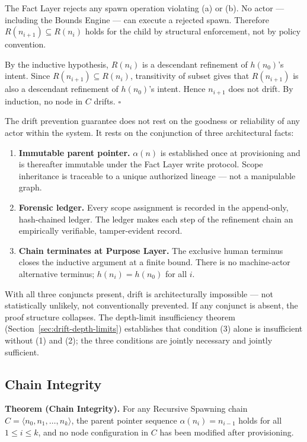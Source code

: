 The Fact Layer rejects any spawn operation violating (a) or (b). No actor — including the Bounds Engine — can execute a rejected spawn. Therefore $R(n_{i+1}) \subseteq R(n_i)$ holds for the child by structural enforcement, not by policy convention.

By the inductive hypothesis, $R(n_i)$ is a descendant refinement of $h(n_0)$'s intent. Since $R(n_{i+1}) \subseteq R(n_i)$, transitivity of subset gives that $R(n_{i+1})$ is also a descendant refinement of $h(n_0)$'s intent. Hence $n_{i+1}$ does not drift. By induction, no node in $C$ drifts. $\square$

\medskip
The drift prevention guarantee does not rest on the goodness or reliability of any actor within the system. It rests on the conjunction of three architectural facts:

\begin{enumerate}
    \item[(1)] \textbf{Immutable parent pointer.} $\alpha(n)$ is established once at provisioning and is thereafter immutable under the Fact Layer write protocol. Scope inheritance is traceable to a unique authorized lineage — not a manipulable graph.
    \item[(2)] \textbf{Forensic ledger.} Every scope assignment is recorded in the append-only, hash-chained ledger. The ledger makes each step of the refinement chain an empirically verifiable, tamper-evident record.
    \item[(3)] \textbf{Chain terminates at Purpose Layer.} The exclusive human terminus closes the inductive argument at a finite bound. There is no machine-actor alternative terminus; $h(n_i) = h(n_0)$ for all $i$.
\end{enumerate}

With all three conjuncts present, drift is architecturally impossible — not statistically unlikely, not conventionally prevented. If any conjunct is absent, the proof structure collapses. The depth-limit insufficiency theorem (Section~\ref{sec:drift-depth-limits}) establishes that condition (3) alone is insufficient without (1) and (2); the three conditions are jointly necessary and jointly sufficient.

\subsection{Chain Integrity}
\label{sec:rs-chain-integrity}

\medskip
\noindent\textbf{Theorem (Chain Integrity).} For any Recursive Spawning chain $C = \langle n_0, n_1, \ldots, n_k \rangle$, the parent pointer sequence $\alpha(n_i) = n_{i-1}$ holds for all $1 \leq i \leq k$, and no node configuration in $C$ has been modified after provisioning.


